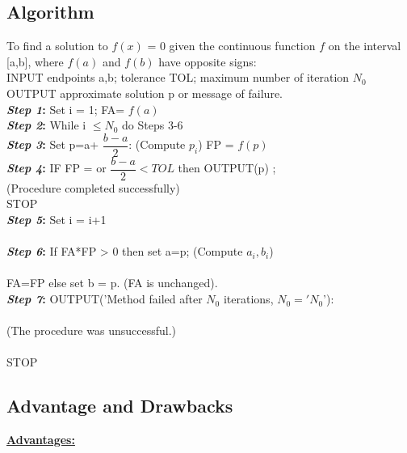 \documentclass[12pt,a4paper]{article}
\begin{document}
	\subsection{Algorithm} 
	
	To find a solution to \(f(x)\) = 0 given the continuous function \(f\) on the interval [a,b], where \(f(a)\) and \(f(b)\) have opposite signs:
	\\
	INPUT  endpoints a,b; tolerance TOL; maximum number of iteration $N_{0}$ \\
	OUTPUT  approximate solution p or message of failure.\\
	
	\textbf{\textit{Step 1}:}   Set i = 1; FA= \(f(a)\) \\
	
	\textbf{\textit{Step 2}:} While i $\leq N_{0}$ do Steps 3-6 \\
	
	\textbf{\textit{Step 3}:} Set p=a+ $\dfrac{b-a}{2}$: (Compute $p_{i}$) 
	FP = \(f(p)\)\\
	\textbf{\textit{Step 4}:} IF FP =  or $ \dfrac{b-a}{2} < TOL$ then OUTPUT(p) ;\\
	\hspace{1in}(Procedure completed successfully)\\
	\hspace{0.5cm}	STOP\\
	
	\textbf{\textit{Step 5}:} Set i = i+1\\ \\
	
	\textbf{\textit{Step 6}:} If FA*FP > 0 then set a=p; (Compute $a_{i},b_{i}$)\\\\
	\hspace{1.5cm} FA=FP
	\hspace{1cm} else set b = p. (FA is unchanged).\\
	
	
	
	\textbf{\textit{Step 7}:}  OUTPUT('Method failed after $N_{0}$ iterations, $N_{0}='N_{0}$'):\\\\
	\hspace{1.5cm}(The procedure was unsuccessful.)\\\\
	\hspace{0.5cm}STOP
	\newpage
	
	\subsection{Advantage and Drawbacks} 
	\textbf{ \underline{Advantages:} }\\
	
\end{document}
